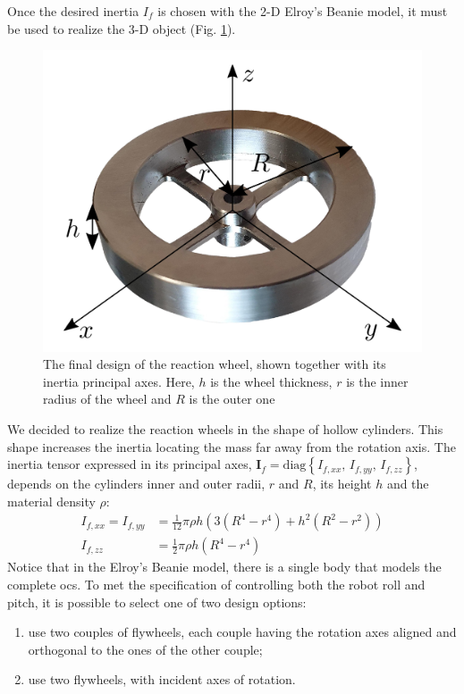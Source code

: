 \documentclass[journal,letterpaper]{IEEEtran}
\begin{document}
Once the desired inertia $I_f$ is chosen with the 2-D Elroy's Beanie model, it must be used to realize the 3-D object (Fig. \ref{fig:flywheel}). 
\begin{figure}
	\centering
	\includegraphics[width=0.7\linewidth]{figures/flywheel.png}
	\caption{The final design of the reaction wheel, shown together with its inertia principal axes. Here, $h$ is the wheel thickness, $r$ is the inner radius of the wheel and $R$ is the outer one}
	\label{fig:flywheel}
\end{figure}
We decided to realize the reaction wheels in the shape of hollow cylinders. This shape increases the inertia locating the mass far away from the rotation axis. The inertia tensor expressed in its principal axes, $\bm{I}_f = \mathrm{diag}\left\{ I_{f, xx}, \, I_{f, yy}, \, I_{f, zz}  \right\}$, depends on the cylinders inner and outer radii, $r$ and $R$, its height $h$ and the material density $\rho$:
\begin{equation}
	\begin{split}
	I_{f, xx} = I_{f, yy} &= \frac{1}{12}\pi \rho h \left(3\left(R^4 - r^4\right) + h^2\left(R^2 - r^2\right)\right) \\
	I_{f, zz} &= \frac{1}{2}\pi \rho h \left(R^4 - r^4\right)
	\end{split}
\end{equation}
Notice that in the Elroy's Beanie model, there is a single body that models the complete \acrshort{ocs}. To met the specification of controlling both the robot roll and pitch, it is possible to select one of two design options:
\begin{enumerate}
	\item use two couples of flywheels, each couple having the rotation axes aligned and orthogonal to the ones of the other couple;
	\item use two flywheels, with incident axes of rotation.
\end{enumerate}
\end{document}
